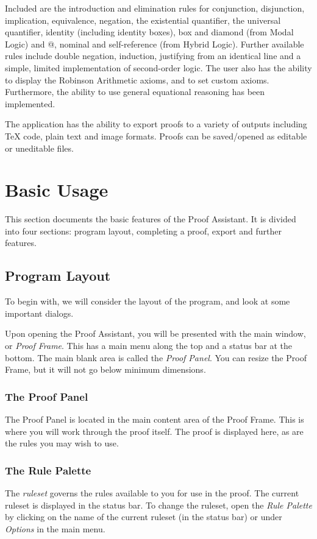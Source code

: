 \documentclass[a4paper]{article}
\begin{document}
Included are the introduction and elimination rules for conjunction, disjunction, implication, equivalence, negation, the existential quantifier, the universal quantifier, identity (including identity boxes), box and diamond (from Modal Logic) and @, nominal and self-reference (from Hybrid Logic). Further available rules include double negation, induction, justifying from an identical line and a simple, limited implementation of second-order logic. The user also has the ability to display the Robinson Arithmetic axioms, and to set custom axioms. Furthermore, the ability to use general equational reasoning has been implemented.

The application has the ability to export proofs to a variety of outputs including {\TeX} code, plain text and image formats. Proofs can be saved/opened as editable or uneditable files.

\section{Basic Usage}
\label{sec:BasicUsage}
This section documents the basic features of the Proof Assistant. It is divided into four sections: program layout, completing a proof, export and further features.

\subsection{Program Layout}
\label{subsec:ProgramLayout}
To begin with, we will consider the layout of the program, and look at some important dialogs.

Upon opening the Proof Assistant, you will be presented with the main window, or \emph{Proof Frame}. This has a main menu along the top and a status bar at the bottom. The main blank area is called the \emph{Proof Panel}. You can resize the Proof Frame, but it will not go below minimum dimensions.

\subsubsection{The Proof Panel}
The Proof Panel is located in the main content area of the Proof Frame. This is where you will work through the proof itself. The proof is displayed here, as are the rules you may wish to use.

\subsubsection{The Rule Palette}
The \emph{ruleset} governs the rules available to you for use in the proof. The current ruleset is displayed in the status bar. To change the ruleset, open the \emph{Rule Palette} by clicking on the name of the current ruleset (in the status bar) or under \emph{Options} in the main menu.
\end{document}
